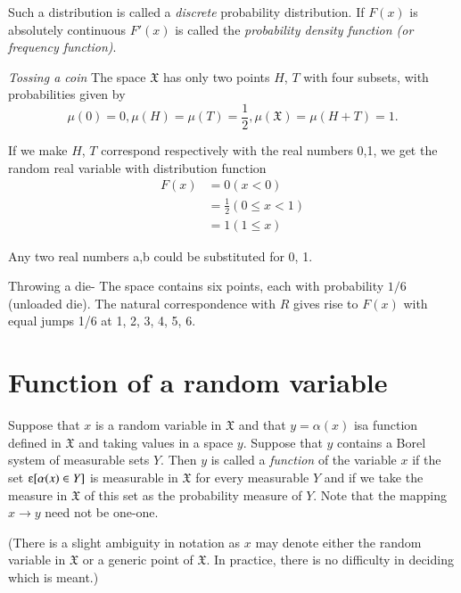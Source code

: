 Such a distribution is called a \textit{discrete} probability distribution. If
$F(x)$ is absolutely continuous $F'(x)$ is called the
\textit{probability density function (or frequency function)}. 

\begin{example}\label{chap2:sec1:exp1}%
\textit{Tossing a coin} The space $\mathfrak{X}$ has only two points
$H$, $T$ with 
four subsets, with probabilities given by 
$$
\mu(0)=0, \mu(H) = \mu(T) = \frac{1}{2}, \mu(\mathfrak{X}) = \mu(H+T) =
1.
$$

If we make $H$, $T$ correspond respectively with the real numbers 0,1, we
get the random real variable with distribution function 
\begin{align*}
  F(x) &= 0 ({x}< 0)\\
  &= \frac{1}{2}(0 \leq {x} < 1)\\
  &= 1(1 \leq x)
\end{align*}

Any two real numbers a,b could be substituted for 0, 1.
\end{example}

\begin{example}\label{chap2:sec1:exp2}%
Throwing a die- The space contains six
  points, each with probability $1/6$ (unloaded die). The natural
  correspondence with $R$ gives rise to $F(x)$ with equal jumps 1/6 at
  1, 2, 3, 4, 5, 6.  
\end{example}

\section{Function of a random variable}\label{chap2:sec2}

Suppose that $x$ is a random variable in $\mathfrak{X}$ and that $y=\alpha
(x)$ 
is\pageoriginale a function defined in $\mathfrak{X}$ and taking values in a
space $y$. Suppose that $y$ contains a Borel
system of measurable sets $Y$. Then $y$ is called a \textit{function} of the
variable $x$ if the set $\varepsilonup[\alpha(x)\in Y]$ is measurable in
$\mathfrak{X}$ for every measurable $Y$ and if we take the measure in
$\mathfrak{X}$ of this set as the probability measure of $Y$. Note that
the mapping $x \rightarrow y$ need not be one-one. 

(There is a slight ambiguity in notation as $x$ may denote either the
random variable in $\mathfrak{X}$ or a generic point of
$\mathfrak{X}$. In practice, there is no difficulty in deciding which
is meant.) 

